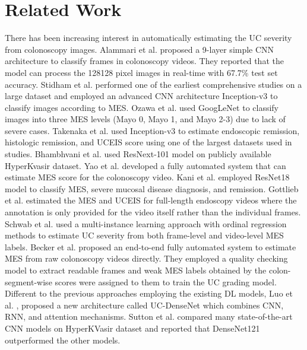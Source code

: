 \documentclass[runningheads]{llncs}
\begin{document}
\section{Related Work}

There has been increasing interest in automatically estimating the UC severity from colonoscopy images. Alammari et al. \cite{alammari2017classification} proposed a 9-layer simple CNN architecture to classify frames in colonoscopy videos. They reported that the model can process the 128128 pixel images in real-time with 67.7\% test set accuracy. Stidham et al. \cite{stidham2019performance} performed one of the earliest comprehensive studies on a large dataset and employed an advanced CNN architecture Inception-v3 \cite{szegedy2016rethinking} to classify images according to MES. Ozawa et al. \cite{ozawa2019novel} used GoogLeNet \cite{szegedy2015going} to classify images into three MES levels (Mayo 0, Mayo 1, and Mayo 2-3) due to lack of severe cases. Takenaka et al. \cite{takenaka2020development} used Inception-v3 \cite{szegedy2016rethinking} to estimate endoscopic remission, histologic remission, and UCEIS score using one of the largest datasets used in studies. Bhambhvani et al. \cite{bhambhvani2021deep} used ResNext-101 model on publicly available HyperKvasir dataset. Yao et al. \cite{yao2021fully} developed a fully automated system that can estimate MES score for the colonoscopy video. Kani et al. \cite{kani2021p099} employed ResNet18 model to classify MES, severe mucosal disease diagnosis, and remission. Gottlieb et al. \cite{gottlieb2021central} estimated the MES and UCEIS for full-length endoscopy videos where the annotation is only provided for the video itself rather than the individual frames. Schwab et al. \cite{schwab2021automatic} used a multi-instance learning approach with ordinal regression methods to estimate UC severity from both frame-level and video-level MES labels. Becker et al. \cite{gutierrez2021training} proposed an end-to-end fully automated system to estimate MES from raw colonoscopy videos directly. They employed a quality checking model to extract readable frames and weak MES labels obtained by the colon-segment-wise scores were assigned to them to train the UC grading model. Different to the previous approaches employing the existing DL models, Luo et al. \cite{luo2022diagnosis}, proposed a new architecture called UC-DenseNet which combines CNN, RNN, and attention mechanisms. Sutton et al. \cite{sutton2022artificial} compared many state-of-the-art CNN models on HyperKVasir \cite{borgli2020hyperkvasir} dataset and reported that DenseNet121 \cite{huang2017densely} outperformed the other models.
\end{document}
